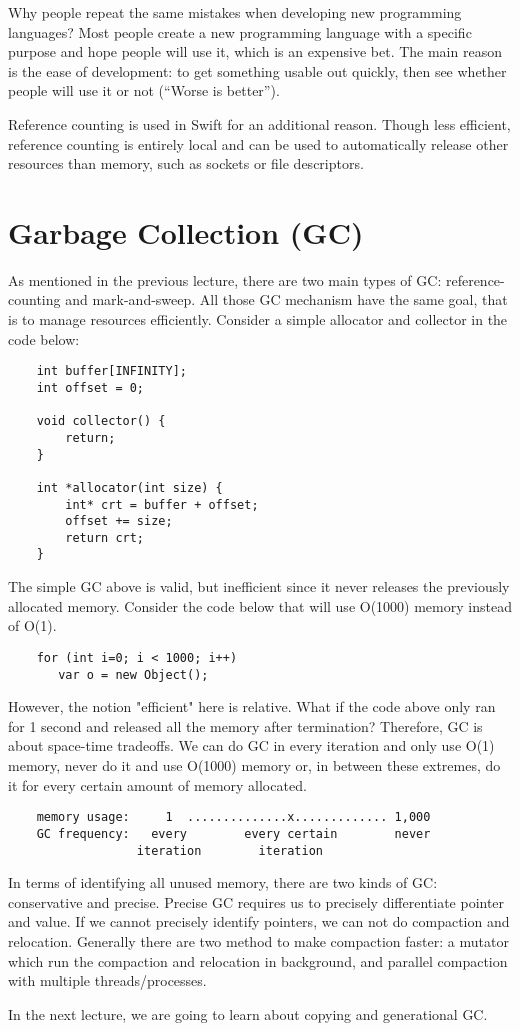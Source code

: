 \documentclass[twoside]{article}
\begin{document}
Why people repeat the same mistakes when developing new programming languages?
Most people create a new programming language with a specific purpose and hope people will use it, which is an expensive bet.
The main reason is the ease of development: to get something usable out quickly, then see whether people will use it or not (“Worse is better”).

Reference counting is used in Swift for an additional reason. Though less efficient, reference counting is entirely local and can be used to automatically release other resources than memory, such as sockets or file descriptors.


\section{Garbage Collection (GC)}
As mentioned in the previous lecture, there are two main types of GC: reference-counting and mark-and-sweep. All those GC mechanism have the same goal, that is to manage resources efficiently. Consider a simple allocator and collector in the code below:
\begin{verbatim}
    int buffer[INFINITY];
    int offset = 0;

    void collector() {
        return;
    }

    int *allocator(int size) {
        int* crt = buffer + offset;
        offset += size;
        return crt;
    }
\end{verbatim}

The simple GC above is valid, but inefficient since it never releases the previously allocated memory. Consider the code below that will use O(1000) memory instead of O(1). 
\begin{verbatim}
    for (int i=0; i < 1000; i++)
       var o = new Object();
\end{verbatim}

However, the notion "efficient" here is relative. What if the code above only ran for 1 second and released all the memory after termination? Therefore, GC is about space-time tradeoffs. We can do GC in every iteration and only use O(1) memory, never do it and use O(1000) memory or, in between these extremes, do it for every certain amount of memory allocated.

\begin{verbatim}
    memory usage:     1  ..............x............. 1,000 
    GC frequency:   every        every certain        never
                  iteration        iteration
\end{verbatim}

In terms of identifying all unused memory, there are two kinds of GC: conservative and precise. Precise GC requires us to precisely differentiate pointer and value. If we cannot precisely identify pointers, we can not do compaction and relocation. Generally there are two method to make compaction faster: a mutator which run the compaction and relocation in background, and parallel compaction with multiple threads/processes.


In the next lecture, we are going to learn about copying and generational GC.
\end{document}
